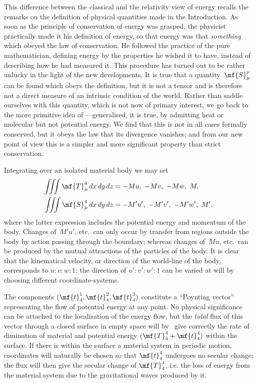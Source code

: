 \documentclass[12pt]{book}
\begin{document}
This difference between the classical and the relativity view of energy
recalls the remarks on the definition of physical quantities made in the Introduction.
As soon as the principle of conservation of energy was grasped, the
physicist practically made it his definition of energy, so that energy was that
\emph{something} which obeyed the law of conservation. He followed the practice of
the pure mathematician, defining energy by the properties he wished it to
have, instead of describing how he had measured it. This procedure has turned
out to be rather unlucky in the light of the new developments. It is true that
a quantity~$\mf{S}_{\mu}^{\nu}$ can be found which obeys the definition, but it is not a tensor
and is therefore not a direct measure of an intrinsic condition of the world.
Rather than saddle ourselves with this quantity, which is not now of primary
interest, we go back to the more primitive idea of ---generalised, it is
true, by admitting heat or molecular  but not potential energy. We
find that this is not in all cases formally conserved, but it obeys the law that
its divergence vanishes; and from our new point of view this is a simpler and
more significant property than strict conservation.

Integrating over an isolated material body we may set
\begin{align*}
\iiint \mf{T}_{\mu}^{4}\, dx\, dy\, dz &= -Mu,\ -Mv,\ -Mw,\ M, \\
\iiint \mf{S}_{\mu}^{4}\, dx\, dy\, dz &= -M'u',\ -M'v',\ -M'w',\ M',
\end{align*}
where the latter expression includes the potential energy and momentum of
the body. Changes of~$M'u'$, etc.\ can only occur by transfer from regions outside
the body by action passing through the boundary; whereas changes of~$Mu$,
%
etc.\ can be produced by the mutual attractions of the particles of the
body. It is clear that the kinematical velocity, or direction of the world-line
of the body, corresponds to $u : v : w : 1$; the direction of $u' : v': w' : 1$ can be varied
at will by choosing different coordinate\hyp{}systems.

The components $(\mf{t}_4^1,\mf{t}_4^2,\mf{t}_4^3)$ constitute a ``Poynting vector'' representing the flow of
potential energy at any point.
No physical significance can be attached to the localisation of the energy flow, but the \emph{total} flux of this
vector through a closed surface in empty space will by~ give correctly the rate of diminution of material
and potential energy $(\mf{T}_4^4 + \mf{t}_4^4)$ within the surface.
If there is within the surface a material system in periodic motion, coordinates will naturally be chosen so that
$\mf{t}_4^4$ undergoes no secular change; the flux will then give the secular change of $\mf{T}_4^4$, i.e. the loss of
energy from the material system due to the gravitational waves produced by it.
\end{document}
